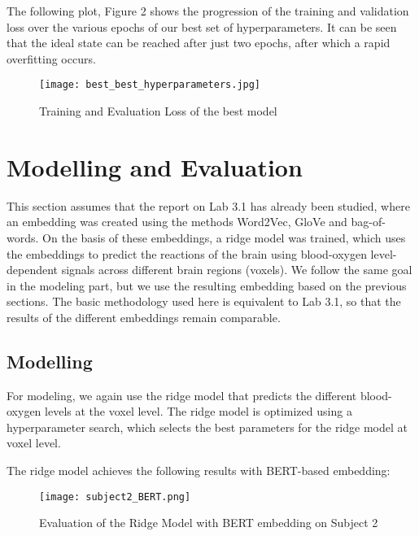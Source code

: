 \documentclass[12pt,letterpaper]{article}
\begin{document}

The following plot, Figure 2 shows the progression of the training and validation loss over the various epochs of our best set of hyperparameters. It can be seen that the ideal state can be reached after just two epochs, after which a rapid overfitting occurs.
    
\begin{figure}[H]
    \centering
    \texttt{[image: best\_best\_hyperparameters.jpg]}
    \caption{Training and Evaluation Loss of the best model}
    \label{fig:enter-label}
\end{figure}

\section{Modelling and Evaluation}

This section assumes that the report on Lab 3.1 has already been studied, where an embedding was created using the methods Word2Vec, GloVe and bag-of-words. On the basis of these embeddings, a ridge model was trained, which uses the embeddings to predict the reactions of the brain using blood-oxygen level-dependent signals across different brain regions (voxels). We follow the same goal in the modeling part, but we use the resulting embedding based on the previous sections. The basic methodology used here is equivalent to Lab 3.1, so that the results of the different embeddings remain comparable.

\subsection{Modelling}
For modeling, we again use the ridge model that predicts the different blood-oxygen levels at the voxel level. The ridge model is optimized using a hyperparameter search, which selects the best parameters for the ridge model at voxel level. 

The ridge model achieves the following results with BERT-based embedding:


\begin{figure}[H]
  \centering
  \texttt{[image: subject2\_BERT.png]}
  \caption{Evaluation of the Ridge Model with BERT embedding on Subject 2}
  \label{fig:evaluation_ridge_bert_subject2}
\end{figure}
\end{document}
